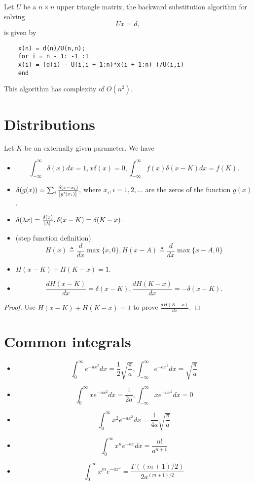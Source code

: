 \begin{refsection}
\begin{note}
	
	Let $U$ be a $n\times n$ upper triangle matrix, the backward substitution algorithm for solving
	$$Ux = d,$$
	is given by
	\begin{verbatim}
	x(n) = d(n)/U(n,n);
	for i = n - 1: -1 :1
	x(i) = (d(i) - U(i,i + 1:n)*x(i + 1:n) )/U(i,i)
	end
	\end{verbatim}
	This algorithm has complexity of $O(n^2)$.	
\end{note}


\section{Distributions}

\begin{lemma}\label{appendix:th:propertiesDeltaFunctionStepFunction}\cite[579]{prosperetti2013advanced} Let $K$ be an externally given parameter. We have
\begin{itemize}
	\item $$\int_{-\infty}^{\infty} \delta(x)dx = 1, x\delta(x) = 0, \int_{-\infty}^{\infty} f(x)\delta(x-K)dx = f(K).$$
	\item $\delta(g(x)) = \sum_{i} \frac{\delta(x-x_i)}{\abs{g'(x_i)}},$
	where $x_i,i=1,2,...$ are the zeros of the function $g(x)$.
	\item $\delta(\lambda x) = \frac{\delta(x)}{\abs{\lambda}}, \delta(x-K) = \delta(K-x)$.
	\item (step function definition) $$H(x)\triangleq \frac{d}{dx}\max\{x,0\}, H(x- A)\triangleq \frac{d}{dx}\max\{x-A,0\}$$
	\item $H(x-K) +　　H(K-x) = 1$.
	\item $$\frac{dH(x-K)}{dx} = \delta(x-K), \frac{dH(K-x)}{dx} = -\delta(x-K).$$	
\end{itemize}
\end{lemma}
\begin{proof}
Use $H(x-K) +　　H(K-x) = 1$ to prove $\frac{dH(K-x)}{dx}$.
\end{proof}

\section{Common integrals}

\begin{lemma}\hfill
\begin{itemize}
	\item $$\int_0^\infty e^{-ax^2}dx = \frac{1}{2}\sqrt{\frac{\pi}{a}},\int_{-\infty}^\infty e^{-ax^2}dx = \sqrt{\frac{\pi}{a}}$$
	\item  $$\int_0^\infty xe^{-ax^2}dx = \frac{1}{2a},\int_{-\infty}^\infty xe^{-ax^2}dx = 0$$
	\item  $$\int_0^\infty x^2e^{-ax^2}dx = \frac{1}{4a}\sqrt{\frac{\pi}{a}}$$
	\item $$\int_0^\infty x^n e^{-ax}dx = \frac{n!}{a^{n+1}}$$
	\item $$\int_0^\infty x^m e^{-ax^2} = \frac{\Gamma((m+1)/2)}{2a^{(m+1)/2}}$$	
\end{itemize}	
	

\end{lemma}
\end{refsection}
